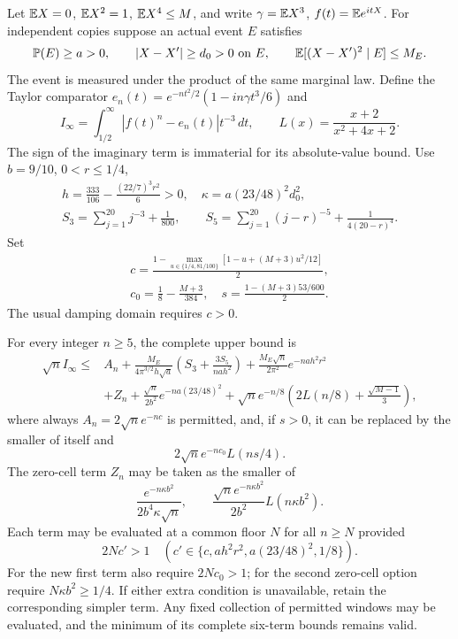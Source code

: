 Let $\mathbb E X=0$, $\mathbb E X^2=1$, $\mathbb E X^4\le M$, and write
$\gamma=\mathbb E X^3$, $f(t)=\mathbb E e^{itX}$. For independent copies suppose an
actual event $E$ satisfies
\[
 \mathbb P(E)\ge a>0,\qquad |X-X'|\ge d_0>0\text{ on }E,\qquad
 \mathbb E[(X-X')^2\mid E]\le M_E.
\]
The event is measured under the product of the same marginal law.
Define the Taylor comparator
$e_n(t)=e^{-nt^2/2}(1-in\gamma t^3/6)$ and
\[
 I_\infty=\int_{1/2}^{\infty}|f(t)^n-e_n(t)|t^{-3}\,dt,
 \qquad L(x)=\frac{x+2}{x^2+4x+2}.
\]
The sign of the imaginary term is immaterial for its absolute-value bound.
Use $b=9/10$, $0<r\le1/4$,
\begin{gather*}
 h=\frac{333}{106}-\frac{(22/7)^3r^2}{6}>0,\quad
 \kappa=a(23/48)^2d_0^2,\\
 S_3=\sum_{j=1}^{20}j^{-3}+\frac1{800},\qquad
 S_5=\sum_{j=1}^{20}(j-r)^{-5}+\frac1{4(20-r)^4}.
\end{gather*}
Set
\[
 \begin{gathered}c=\frac{1-\max_{u\in\{1/4,81/100\}}
              [1-u+(M+3)u^2/12]}2,\\
 c_0=\frac18-\frac{M+3}{384},\quad
 s=\frac{1-(M+3)53/600}{2}.\end{gathered}
\]
The usual damping domain requires $c>0$.

\begin{lemma}\label{ms:fourier:window50}
For every integer $n\ge5$, the complete upper bound is
\begin{align*}
 \sqrt n I_\infty\le{}& A_n
 +\frac{M_E}{4\pi^{3/2}h\sqrt a}
       \left(S_3+\frac{3S_5}{nah^2}\right)
 +\frac{M_E\sqrt n}{2\pi^2}e^{-nah^2r^2}\\
 &+Z_n+\frac{\sqrt n}{2b^2}e^{-na(23/48)^2}
 +\sqrt n e^{-n/8}\left(2L(n/8)+\frac{\sqrt{M-1}}3\right),
\end{align*}
where always $A_n=2\sqrt n e^{-nc}$ is permitted, and, if $s>0$,
it can be replaced by the smaller of itself and
\[
 2\sqrt n e^{-nc_0}L(ns/4).
\]
The zero-cell term $Z_n$ may be taken as the smaller of
\[
 \frac{e^{-n\kappa b^2}}{2b^4\kappa\sqrt n},\qquad
 \frac{\sqrt n e^{-n\kappa b^2}}{2b^2}L(n\kappa b^2).
\]
Each term may be evaluated at a common floor $N$ for all $n\ge N$
provided
\[
 2Nc'>1\quad(c'\in\{c,ah^2r^2,a(23/48)^2,1/8\}).
\]
For the new first term also require $2Nc_0>1$;
for the second zero-cell option require $N\kappa b^2\ge1/4$.
If either extra condition is unavailable, retain the corresponding simpler term.
Any fixed collection of permitted windows may be evaluated, and the minimum
of its complete six-term bounds remains valid.
\end{lemma}

